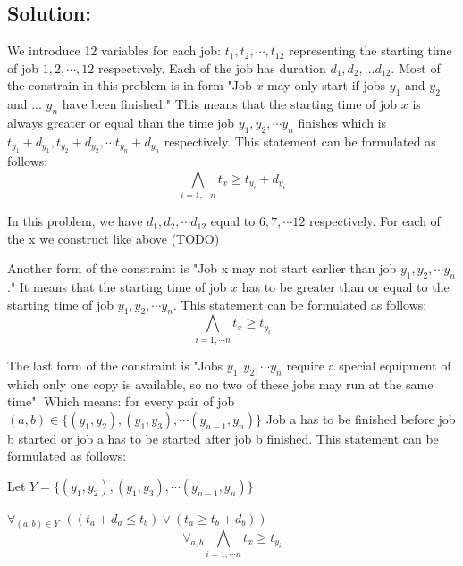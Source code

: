 \documentclass[12pt]{article}
\begin{document}
\subsection*{Solution:}
We introduce 12 variables for each job: $t_1, t_2, \cdots , t_{12}$ representing the starting time of job $1, 2, \cdots, 12$ respectively. Each of the job has duration $d_1, d_2, ... d_{12}$. Most of the constrain in this problem is in form "Job $x$ may only start if jobs $y_1$ and $y_2$ and ... $y_n$ have been finished." This means that the starting time of job $x$ is always greater or equal than the time job $y_1, y_2, \cdots y_n$ finishes which is $t_{y_1}+d_{y_1}, t_{y_2}+d_{y_2}, \cdots t_{y_n}+d_{y_n}$ respectively. This statement can be formulated as follows:
\[ \bigwedge_{i=1,\cdots n} t_x \geq t_{y_i}+d_{y_i} \]

In this problem, we have $d_1, d_2, \cdots d_{12}$ equal to $6, 7, \cdots 12$ respectively. For each of the x we construct like above (TODO)

Another form of the constraint is "Job x may not start earlier than job $y_1, y_2, \cdots y_n$." It means that the starting time of job $x$ has to be greater than or equal to the starting time of job $y_1, y_2, \cdots y_n$. This statement can be formulated as follows:
\[ \bigwedge_{i=1,\cdots n} t_x \geq t_{y_i} \]

The last form of the constraint is "Jobs $y_1, y_2, \cdots y_n$ require a special equipment of which only one copy is available, so no two of these jobs may run at the same time". Which means: for every pair of job $(a,b) \in \{(y_1, y_2), (y_1, y_3), \cdots (y_{n-1}, y_{n})\}$ Job a has to be finished before job b started or job a has to be started after job b finished. This statement can be formulated as follows:

Let $Y=\{(y_1, y_2), (y_1, y_3), \cdots (y_{n-1}, y_{n})\}$

   {\Large $\forall_{(a,b) \in Y}$} $((t_a + d_a \leq t_b) \vee (t_a \geq t_b+d_b) )$
   \[ \forall_{a,b}\bigwedge_{i=1,\cdots n} t_x \geq t_{y_i} \]
\end{document}
